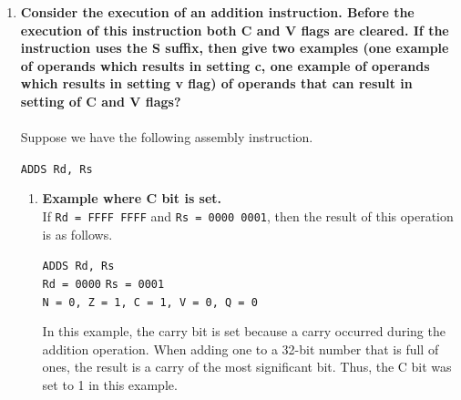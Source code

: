 \documentclass{article}
\begin{document}
\begin{enumerate}
	
	\item \textbf{Consider the execution of an addition instruction. Before the execution of this instruction both C and V flags are cleared. If the instruction uses the S suffix, then give two examples (one example of operands which results in setting c, one example of operands which results in setting v flag) of operands that can result in setting of C and V flags?}
    \\
    \\
    Suppose we have the following assembly instruction.
    \begin{center}
        \texttt{ADDS Rd, Rs}
    \end{center}
    \begin{enumerate}
        \item \textbf{Example where C bit is set.}
        \\
        If  \texttt{Rd = FFFF FFFF}  and  \texttt{Rs = 0000 0001}, then the result of this operation is as follows.
        \begin{center}
            \texttt{ADDS Rd, Rs}
            \\
            \texttt{Rd = 0000} \hspace{0.4cm} \texttt{Rs = 0001}
            \\
            \texttt{N = 0, Z = 1, C = 1, V = 0, Q = 0}
        \end{center}
        In this example, the carry bit is set because a carry occurred during the addition operation. When adding one to a 32-bit number that is full of ones, the result is a carry of the most significant bit. Thus, the C bit was set to 1 in this example.
        

\end{enumerate}
\end{enumerate}
\end{document}
